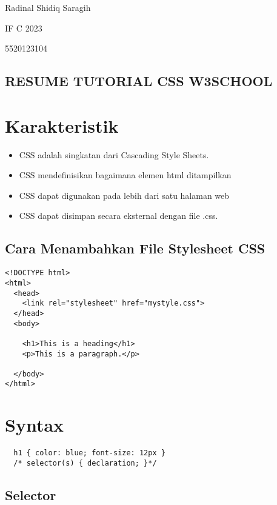 \documentclass[12pt,a4paper]{article}
\date{}
\begin{document}
Radinal Shidiq Saragih

IF C 2023

5520123104

\begin{center}
  \section*{RESUME TUTORIAL CSS W3SCHOOL}
\end{center}

\section*{Karakteristik}

\begin{itemize}
  \item CSS adalah singkatan dari Cascading Style Sheets.
  \item CSS mendefinisikan bagaimana elemen html ditampilkan
  \item CSS dapat digunakan pada lebih dari satu halaman web
  \item CSS dapat disimpan secara eksternal dengan file .css.
\end{itemize}

\subsection*{Cara Menambahkan File Stylesheet CSS}

\begin{lstlisting}
<!DOCTYPE html>
<html>
  <head>
    <link rel="stylesheet" href="mystyle.css">
  </head>
  <body>

    <h1>This is a heading</h1>
    <p>This is a paragraph.</p>

  </body>
</html>
\end{lstlisting}

\section*{Syntax}

\begin{lstlisting}
  h1 { color: blue; font-size: 12px }
  /* selector(s) { declaration; }*/
\end{lstlisting}

\subsection*{Selector}
\end{document}
